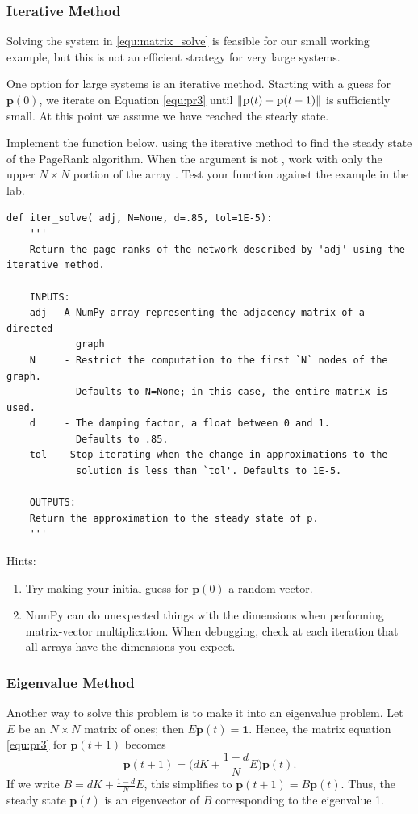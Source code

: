 \subsubsection*{Iterative Method}
Solving the system in \eqref{equ:matrix_solve} is feasible for our small working example, but this is not an efficient strategy for very large systems.

One option for large systems is an iterative method.
Starting with a guess for $\mathbf{p}(0)$, we iterate on Equation \eqref{equ:pr3} until $\left\lVert\mathbf{p}(t)-\mathbf{p}(t-1)\right\rVert$ is sufficiently small.
At this point we assume we have reached the steady state.


\begin{problem}
\label{prob:pagerank_dense_iter}
Implement the function below, using the iterative method to find the steady state of the PageRank algorithm.
When the argument  is not , work with only the upper $N \times N$ portion of the array .
Test your function against the example in the lab.
\begin{lstlisting}
def iter_solve( adj, N=None, d=.85, tol=1E-5):
    '''
    Return the page ranks of the network described by 'adj' using the iterative method.

    INPUTS:
    adj - A NumPy array representing the adjacency matrix of a directed
            graph
    N     - Restrict the computation to the first `N` nodes of the graph.
            Defaults to N=None; in this case, the entire matrix is used.
    d     - The damping factor, a float between 0 and 1.
            Defaults to .85.
    tol  - Stop iterating when the change in approximations to the
            solution is less than `tol'. Defaults to 1E-5.

    OUTPUTS:
    Return the approximation to the steady state of p.
    '''
\end{lstlisting}
Hints:
\begin{enumerate}
\item Try making your initial guess for $\mathbf{p}(0)$ a random vector.
\item NumPy can do unexpected things with the dimensions when performing matrix-vector multiplication.
When debugging, check at each iteration that all arrays have the dimensions you expect.
\end{enumerate}
\end{problem}

\subsubsection*{Eigenvalue Method}
Another way to solve this problem is to make it into an eigenvalue problem.
Let $E$ be an $N \times N$ matrix of ones; then $E\mathbf{p}(t) = \mathbf{1}$.
Hence, the matrix equation \eqref{equ:pr3} for $\mathbf{p}(t+1)$ becomes
\[\mathbf{p}(t+1) = \Big(dK + \frac{1-d}{N}E\Big)\mathbf{p}(t).\]
If we write $B = dK + \frac{1-d}{N}E$, this simplifies to $\mathbf{p}(t+1) = B\mathbf{p}(t).$
Thus, the steady state $\mathbf{p}(t)$ is an eigenvector of $B$ corresponding to the eigenvalue 1.


